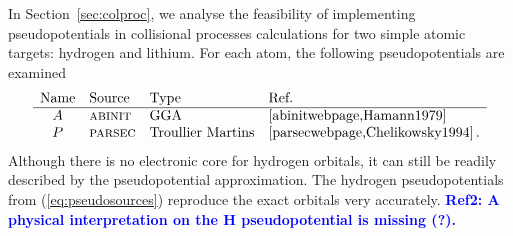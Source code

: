 \documentclass[10pt]{article}
\begin{document}
In Section~\ref{sec:colproc}, we analyse the feasibility of 
implementing pseudopotentials in collisional processes calculations for two 
simple atomic targets: hydrogen and lithium. For each atom, the 
following pseudopotentials are examined
\begin{equation}
 \begin{array}{clll}
  \mbox{Name} & \mbox{Source} & \mbox{Type} & \mbox{Ref.} \\
  \hline  
  A & \mbox{\sc abinit} & \mbox{GGA} & \cite{abinitwebpage,Hamann1979} \\
  P & \mbox{\sc parsec} & \mbox{Troullier Martins} & \cite{parsecwebpage,Chelikowsky1994}\,.
 \end{array}
 \label{eq:pseudosources}
\end{equation}
Although there is no electronic core for hydrogen orbitals, it
can still be readily described by the pseudopotential 
approximation. The hydrogen pseudopotentials from 
(\ref{eq:pseudosources}) reproduce the exact orbitals very 
accurately. 
\textcolor{blue}{\bf Ref2: A physical interpretation on the H 
pseudopotential is missing (?).}
\end{document}
